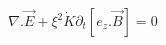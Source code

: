 \begin{equation}
{\nabla}.\vec{E}+{\xi}^{2}\dot{K}{\partial}_{t}[{e_{z}.\vec{B}}]=0
\label{23}
\end{equation}

